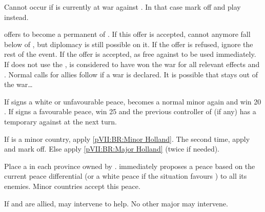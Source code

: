 

\condition{}
\aparag Cannot occur if \paysbaviere is currently at war against \AUS. In that
case mark off and play \RD instead.

\phevnt
\aparag \paysbaviere offers to become a permanent \AM of \AUS.
\bparag If this offer is accepted, \paysbaviere cannot anymore fall below \AM
of \AUS, but diplomacy is still possible on it.
\bparag If the offer is refused, ignore the rest of the event.
\aparag If the offer is accepted, \PRU as free \CB against \AUS to be used
immediately.
\aparag If \PRU does not use the \CB, \AUS is considered to have won the war
for all relevant effects and \VP.
\bparag Normal calls for allies follow if a war is declared.
\bparag It is possible that \paysbaviere stays out of the war\ldots

\phpaix
\aparag If \AUS signs a white or unfavourable peace, \paysbaviere becomes a
normal minor again and \PRU win 20 \VP.
\aparag If \AUS signs a favourable peace, \AUS win 25 \VP and the previous
controller of \paysbaviere (if any) has a temporary \CB against \AUS at the
next turn.





\condition{}
\aparag If \payshollande is a minor country, apply \ref{pVII:BR:Minor
  Holland}. The second time, apply \RD and mark off.
\aparag Else apply \ref{pVII:BR:Major Holland} (twice if needed).



\phevnt
\aparag Place a \REVOLT \facemoins in each province owned by \HOLmin.
\aparag \HOLMin immediately proposes a peace based on the current peace
differential (or a white peace if the situation favours \HOLmin) to all its
enemies.
\bparag Minor countries accept this peace.

\phdipl
\aparag If \HOLmin and \PRU are allied, \PRU may intervene to help.
\bparag No other major may intervene.

